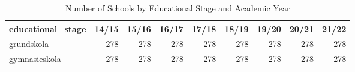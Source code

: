 \begin{table}[!h]
\centering
\caption{Number of Schools by Educational Stage and Academic Year}
\centering
\begin{tabular}[t]{lrrrrrrrr}
\toprule
educational\_stage & 14/15 & 15/16 & 16/17 & 17/18 & 18/19 & 19/20 & 20/21 & 21/22\\
\midrule
grundskola & 278 & 278 & 278 & 278 & 278 & 278 & 278 & 278\\
gymnasieskola & 278 & 278 & 278 & 278 & 278 & 278 & 278 & 278\\
\bottomrule
\end{tabular}
\end{table}
